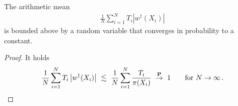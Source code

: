\begin{lemma}
  The arithmetic mean
  \begin{align*}
    \frac{1}{N}
    \sum_{i=1}^{N} 
    T_i
    \left| 
    w^\dagger(X_i)
    \right|
  \end{align*}
  is bounded above by a random variable that converges in probability to a constant.
\end{lemma}
\begin{proof}
  It holds
  \begin{align*}
    \frac{1}{N}
    \sum_{i=1}^{N} 
    T_i
    \left| 
    w^\dagger(X_i)
    \right|
    \ 
    \lesssim
    \ 
    \frac{1}{N}
    \sum_{i=1}^{N} 
    \frac{T_i}{\pi(X_i)}
    \ 
    \overset{\P}{\to}
    \ 
    1
    \qquad
    \text{for}\ 
    N \to \infty
    \,.
  \end{align*}
\end{proof}
